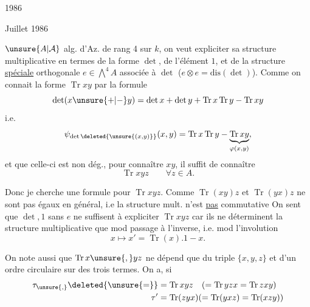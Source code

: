 \hfill {} 1986\par
\hfill Juillet 1986

$\unsure{A|\mathcal A}$ alg. d'Az. de rang 4 sur $k$, on veut expliciter sa structure multiplicative en termes de la forme $\det$, de l'élément $1$, et de la structure \uline{spéciale} orthogonale $e\in\bigwedge^4 A$   associée à $\det$ ($e\otimes e=\mathrm{dis}(\det)$). Comme on connait la forme $\operatorname{Tr}xy$ par la formule
\[
 \det(x\unsure{+|-}y)=\det x+\det y+\operatorname{Tr}x\operatorname{Tr}y-\operatorname{Tr}xy
\]
i.e.
\[
 \psi_{\det\deleted{\unsure{(x,y)}}}(x,y)=\operatorname{Tr}x\operatorname{Tr}y-\underbrace{\operatorname{Tr}xy}_{\varphi(x,y)},
\]
 et que celle-ci est non dég., pour connaître $xy$, il suffit de connaître
\[
 \operatorname{Tr}xyz\qquad\forall z\in A.
\]

Donc je cherche une formule pour $\operatorname{Tr}xyz$. Comme $\operatorname{Tr}(xy)z$ et $\operatorname{Tr}(yx)z$ ne sont pas égaux en général, i.e la structure mult.  n'est \uline{pas} commutative
 On sent que $\det,1$ sans $e$ ne suffisent à expliciter $\operatorname{Tr}xyz$ car ils ne déterminent la structure multiplicative que mod passage à l'inverse, i.e. mod l'involution
\[
 x\longmapsto x'=\operatorname{Tr}(x).1-x.
\]

On note aussi que $\operatorname{Tr}x\unsure{,}yz$ ne dépend que du triple $\{x,y,z\}$ et d'un ordre circulaire sur  des trois termes. On a,  si
\[
\begin{aligned}
\tau_{\unsure{,}}\deleted{\unsure{=}}&=\operatorname{Tr}xyz\quad(=\operatorname{Tr}yzx=\operatorname{Tr}zxy)\\
\tau'&=\operatorname{Tr}(zyx)(=\operatorname{Tr}(yxz)=\operatorname{Tr}(xzy))
\end{aligned}
\]
